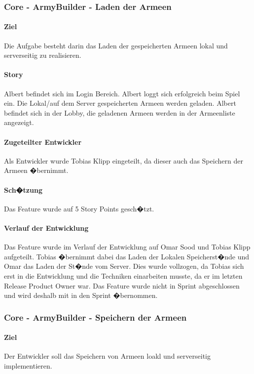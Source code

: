 \documentclass[12pt, titlepage]{scrartcl}
\newcommand{\RN}[1]{%
	\textup{\uppercase\expandafter{\romannumeral#1}}%
}
\begin{document}
		\subsubsection{Core - ArmyBuilder - Laden der Armeen}
		\paragraph{Ziel} Die Aufgabe besteht darin das Laden der gespeicherten Armeen lokal und serverseitig zu realisieren.
		\paragraph{Story} Albert befindet sich im Login Bereich. Albert loggt sich erfolgreich beim Spiel ein. Die Lokal/auf dem Server gespeicherten Armeen werden geladen. Albert befindet sich in der Lobby, die geladenen Armeen werden in der Armeenliste angezeigt.
		\paragraph{Zugeteilter Entwickler} Als Entwickler wurde Tobias Klipp eingeteilt, da dieser auch das Speichern der Armeen �bernimmt.
		\paragraph{Sch�tzung}
		Das Feature wurde auf 5 Story Points gesch�tzt.
		\paragraph{Verlauf der Entwicklung} Das Feature wurde im Verlauf der Entwicklung auf Omar Sood und Tobias Klipp aufgeteilt. Tobias �bernimmt dabei das Laden der Lokalen Speicherst�nde und Omar das Laden der St�nde vom Server. Dies wurde vollzogen, da Tobias sich erst in die Entwicklung und die Techniken einarbeiten musste, da er im letzten Release Product Owner war. Das Feature wurde nicht in Sprint \RN{3} abgeschlossen und wird deshalb mit in den Sprint \RN{4} �bernommen.
		
		\subsubsection{Core - ArmyBuilder - Speichern der Armeen}
		\paragraph{Ziel} Der Entwickler soll das Speichern von Armeen loakl und serverseitig implementieren.
\end{document}
